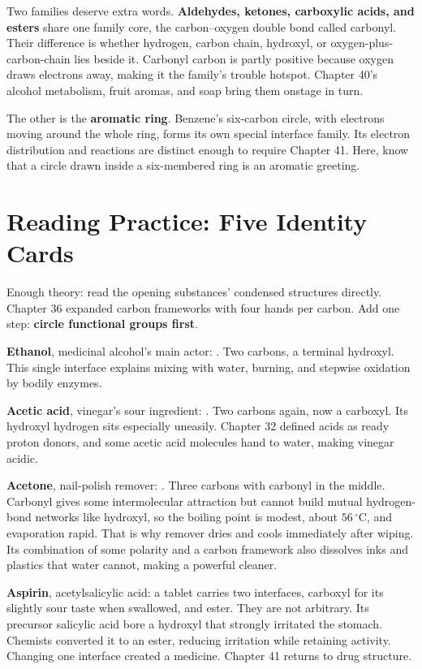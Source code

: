 Two families deserve extra words. \textbf{Aldehydes, ketones, carboxylic acids, and esters} share one family core, the carbon--oxygen double bond called carbonyl. Their difference is whether hydrogen, carbon chain, hydroxyl, or oxygen-plus-carbon-chain lies beside it. Carbonyl carbon is partly positive because oxygen draws electrons away, making it the family's trouble hotspot. Chapter 40's alcohol metabolism, fruit aromas, and soap bring them onstage in turn.

The other is the \textbf{aromatic ring}. Benzene's six-carbon circle, with electrons moving around the whole ring, forms its own special interface family. Its electron distribution and reactions are distinct enough to require Chapter 41. Here, know that a circle drawn inside a six-membered ring is an aromatic greeting.

\section{Reading Practice: Five Identity Cards}

Enough theory: read the opening substances' condensed structures directly. Chapter 36 expanded carbon frameworks with four hands per carbon. Add one step: \textbf{circle functional groups first}.

\textbf{Ethanol}, medicinal alcohol's main actor: . Two carbons, a terminal hydroxyl. This single interface explains mixing with water, burning, and stepwise oxidation by bodily enzymes.

\textbf{Acetic acid}, vinegar's sour ingredient: . Two carbons again, now a carboxyl. Its hydroxyl hydrogen sits especially uneasily. Chapter 32 defined acids as ready proton donors, and some acetic acid molecules hand  to water, making vinegar acidic.

\textbf{Acetone}, nail-polish remover: . Three carbons with carbonyl in the middle. Carbonyl gives some intermolecular attraction but cannot build mutual hydrogen-bond networks like hydroxyl, so the boiling point is modest, about $56\,^{\circ}\mathrm{C}$, and evaporation rapid. That is why remover dries and cools immediately after wiping. Its combination of some polarity and a carbon framework also dissolves inks and plastics that water cannot, making a powerful cleaner.

\textbf{Aspirin}, acetylsalicylic acid: a tablet carries two interfaces, carboxyl for its slightly sour taste when swallowed, and ester. They are not arbitrary. Its precursor salicylic acid bore a hydroxyl that strongly irritated the stomach. Chemists converted it to an ester, reducing irritation while retaining activity. Changing one interface created a medicine. Chapter 41 returns to drug structure.

